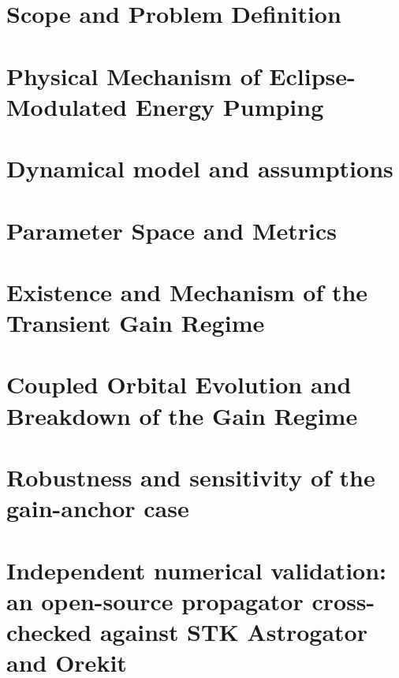 \documentclass[a4paper,fleqn]{cas-dc}
\begin{document}
\vspace{-1em}
\section{Scope and Problem Definition}
\vspace{-0.5em}




\section{Physical Mechanism of Eclipse-Modulated \newline Energy Pumping}
\label{sec:physics}


\section{Dynamical model and assumptions}
\label{sec:model}


\section{Parameter Space and Metrics}
\label{sec:paramspace}


\section{Existence and Mechanism of the Transient Gain Regime}
\label{sec:existence}


\section{Coupled Orbital Evolution and Breakdown of the Gain Regime}
\label{sec:breakdown}


\section{Robustness and sensitivity of the gain-anchor case}
\label{sec:sensitivity}


\section{Independent numerical validation: an open-source propagator cross-checked against STK Astrogator and Orekit}
\label{sec:validation}

\end{document}
